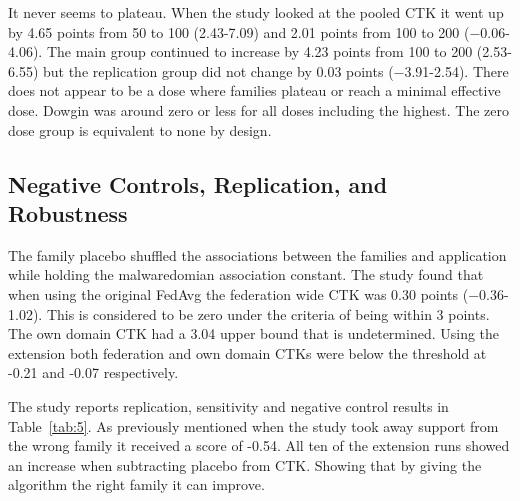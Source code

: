\documentclass[12pt,letterpaper]{article}
\begin{document}
It never seems to plateau. When the study looked at the pooled CTK it went up by 4.65 points from 50 to 100 (2.43-7.09) and 2.01 points from 100 to 200 (−0.06-4.06). The main group continued to increase by 4.23 points from 100 to 200 (2.53-6.55) but the replication group did not change by 0.03 points (−3.91-2.54). There does not appear to be a dose where families plateau or reach a minimal effective dose. Dowgin was around zero or less for all doses including the highest. The zero dose group is equivalent to none by design.

\subsection*{Negative Controls, Replication, and Robustness} 

The family placebo shuffled the associations between the families and application while holding the malwaredomian association constant. The study found that when using the original FedAvg the federation wide CTK was 0.30 points (−0.36-1.02). This is considered to be zero under the criteria of being within 3 points. The own domain CTK had a 3.04 upper bound that is undetermined. Using the extension both federation and own domain CTKs were below the threshold at -0.21 and -0.07 respectively.

The study reports replication, sensitivity and negative control results in Table~\ref{tab:5}. As previously mentioned when the study took away support from the wrong family it received a score of -0.54. All ten of the extension runs showed an increase when subtracting placebo from CTK. Showing that by giving the algorithm the right family it can improve.
\end{document}
